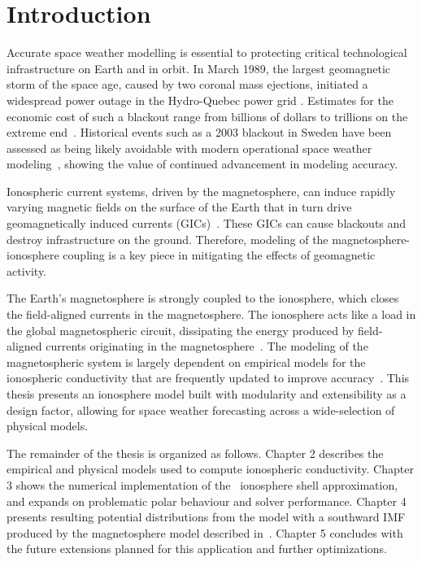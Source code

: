 \chapter{Introduction}
\label{chap:introduction}
Accurate space weather modelling is essential to protecting critical technological infrastructure on Earth and in orbit. In March 1989, the largest geomagnetic storm of the space age, caused by two coronal mass ejections, initiated a widespread power outage in the Hydro-Quebec power grid \citep{21st_boteler_2019}. Estimates for the economic cost of such a blackout range from billions of dollars to trillions on the extreme end~\citep{economic_eastwood_2017}. Historical events such as a 2003 blackout in Sweden have been assessed as being likely avoidable with modern operational space weather modeling~\citep{economic_eastwood_2017}, showing the value of continued advancement in modeling accuracy.

Ionospheric current systems, driven by the magnetosphere, can induce rapidly varying magnetic fields on the surface of the Earth that in turn drive geomagnetically induced currents (GICs)~\citep{scientific_eastwood_2017}. These GICs can cause blackouts and destroy infrastructure on the ground. Therefore, modeling of the magnetosphere-ionosphere coupling is a key piece in mitigating the effects of geomagnetic activity.

The Earth's magnetosphere is strongly coupled to the ionosphere, which closes the field-aligned currents in the magnetosphere. The ionosphere acts like a load in the global magnetospheric circuit, dissipating the energy produced by field-aligned currents originating in the magnetosphere~\citep{impacts_liu_2023}. The modeling of the magnetospheric system is largely dependent on empirical models for the ionospheric conductivity that are frequently updated to improve accuracy~\citep{moen1993, goodman1995, cousins2015}. This thesis presents an ionosphere model built with modularity and extensibility as a design factor, allowing for space weather forecasting across a wide-selection of physical models.

The remainder of the thesis is organized as follows. Chapter 2 describes the empirical and physical models used to compute ionospheric conductivity. Chapter 3 shows the numerical implementation of the~\citet{goodman1995} ionosphere shell approximation, and expands on problematic polar behaviour and solver performance. Chapter 4 presents resulting potential distributions from the model with a southward IMF produced by the magnetosphere model described in~\citet{global_groth_2000}. Chapter 5 concludes with the future extensions planned for this application and further optimizations.

